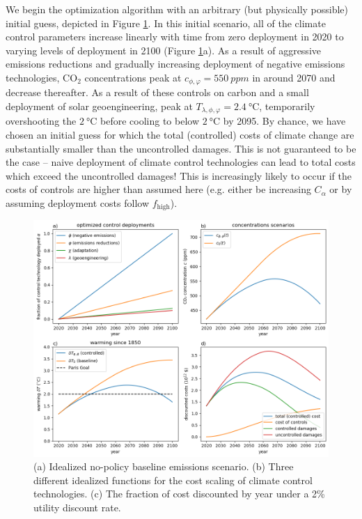 \documentclass{article}
\begin{document}
We begin the optimization algorithm with an arbitrary (but physically possible) initial guess, depicted in Figure \ref{fig-initial-guess}. In this initial scenario, all of the climate control parameters increase linearly with time from zero deployment in 2020 to varying levels of deployment in 2100 (Figure \ref{fig-initial-guess}a). As a result of aggressive emissions reductions and gradually increasing deployment of negative emissions technologies, CO$_{2}$ concentrations peak at $c_{\phi, \varphi} = \SI{550}{ppm}$ in around 2070 and decrease thereafter. As a result of these controls on carbon and a small deployment of solar geoengineering, peak at $T_{\lambda, \phi, \varphi} = \SI{2.4}{\celsius}$, temporarily overshooting the $\SI{2}{\celsius}$ before cooling to below $\SI{2}{\celsius}$ by 2095. By chance, we have chosen an initial guess for which the total (controlled) costs of climate change are substantially smaller than the uncontrolled damages. This is not guaranteed to be the case – naive deployment of climate control technologies can lead to total costs which exceed the uncontrolled damages! This is increasingly likely to occur if the costs of controls are higher than assumed here (e.g. either be increasing $C_{\alpha}$ or by assuming deployment costs follow $f_{\text{high}}$).

\begin{figure}[htb!]
\noindent\includegraphics[width=1.0\textwidth]{figures/model_trajectories_initial_guess.png}
\centering
\caption{(a) Idealized no-policy baseline emissions scenario. (b) Three different idealized functions for the cost scaling of climate control technologies. (c) The fraction of cost discounted by year under a 2\% utility discount rate.}
\label{fig-initial-guess}
\end{figure}
\end{document}
